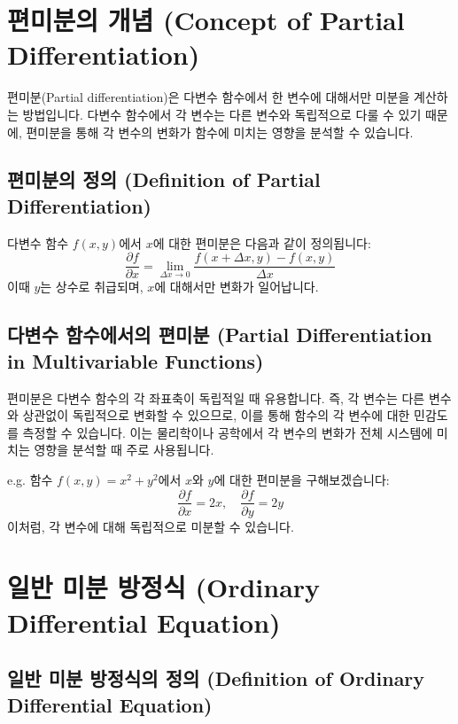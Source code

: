 \documentclass[12pt]{article}
\begin{document}
\section{편미분의 개념 (Concept of Partial Differentiation)}

\noindent 편미분(Partial differentiation)은 다변수 함수에서 한 변수에 대해서만 미분을 계산하는 방법입니다. 다변수 함수에서 각 변수는 다른 변수와 독립적으로 다룰 수 있기 때문에, 편미분을 통해 각 변수의 변화가 함수에 미치는 영향을 분석할 수 있습니다.

\subsection{편미분의 정의 (Definition of Partial Differentiation)}

\noindent 다변수 함수 \( f(x, y) \)에서 \( x \)에 대한 편미분은 다음과 같이 정의됩니다:
\[
  \frac{\partial f}{\partial x} = \lim_{\Delta x \to 0} \frac{f(x + \Delta x, y) - f(x, y)}{\Delta x}
\]
이때 \( y \)는 상수로 취급되며, \( x \)에 대해서만 변화가 일어납니다.

\subsection{다변수 함수에서의 편미분 (Partial Differentiation in Multivariable Functions)}

\noindent 편미분은 다변수 함수의 각 좌표축이 독립적일 때 유용합니다. 즉, 각 변수는 다른 변수와 상관없이 독립적으로 변화할 수 있으므로, 이를 통해 함수의 각 변수에 대한 민감도를 측정할 수 있습니다. 이는 물리학이나 공학에서 각 변수의 변화가 전체 시스템에 미치는 영향을 분석할 때 주로 사용됩니다.

\vspace{2\baselineskip}
\noindent {} e.g. 함수 \( f(x, y) = x^2 + y^2 \)에서 \( x \)와 \( y \)에 대한 편미분을 구해보겠습니다:
\[
  \frac{\partial f}{\partial x} = 2x, \quad \frac{\partial f}{\partial y} = 2y
\]
이처럼, 각 변수에 대해 독립적으로 미분할 수 있습니다.

\section{일반 미분 방정식 (Ordinary Differential Equation)}

\subsection{일반 미분 방정식의 정의 (Definition of Ordinary Differential Equation)}
\end{document}
